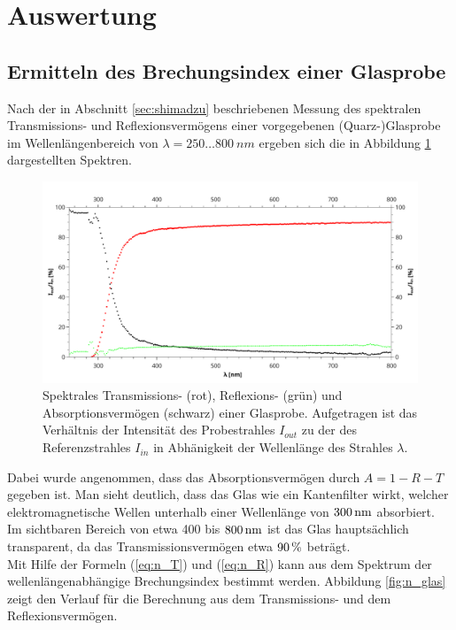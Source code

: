 \section{Auswertung}
\subsection{Ermitteln des Brechungsindex einer Glasprobe}
	Nach der in Abschnitt \ref{sec:shimadzu} beschriebenen Messung des spektralen Transmissions- und Reflexionsvermögens einer vorgegebenen (Quarz-)Glasprobe im Wellenlängenbereich von $\lambda = 250\dots800\ \unit{nm}$ ergeben sich die in Abbildung \ref{fig:R_T_glas} dargestellten Spektren.
	\begin{figure}[ht]
		\centering
		\includegraphics[width=\linewidth]{pic/R_T_glas.pdf}
		\caption{Spektrales Transmissions- (rot), Reflexions- (grün) und Absorptionsvermögen (schwarz) einer Glasprobe. Aufgetragen ist das Verhältnis der Intensität des Probestrahles $I_{out}$ zu der des Referenzstrahles $I_{in}$ in Abhänigkeit der Wellenlänge des Strahles $\lambda$.}
		\label{fig:R_T_glas}
	\end{figure}
	Dabei wurde angenommen, dass das Absorptionsvermögen durch $A = 1 - R - T$ gegeben ist. Man sieht deutlich, dass das Glas wie ein Kantenfilter wirkt, welcher elektromagnetische Wellen unterhalb einer Wellenlänge von $\unit[300]{nm}$ absorbiert. Im sichtbaren Bereich von etwa 400 bis $\unit[800]{nm}$ ist das Glas hauptsächlich transparent, da das Transmissionsvermögen etwa $\unit[90]{\%}$ beträgt.\\
	Mit Hilfe der Formeln (\ref{eq:n_T}) und (\ref{eq:n_R}) kann aus dem Spektrum der wellenlängenabhängige Brechungsindex bestimmt werden. Abbildung \ref{fig:n_glas} zeigt den Verlauf für die Berechnung aus dem Transmissions- und dem Reflexionsvermögen.
